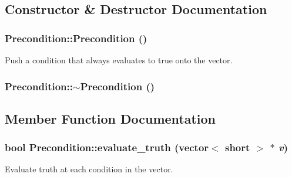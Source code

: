 \subsection{Constructor \& Destructor Documentation}
\hypertarget{classPrecondition_ab7e54d0ab9cbfb4b4a6cb03a20946207}{
\subsubsection[{Precondition}]{\setlength{\rightskip}{0pt plus 5cm}Precondition::Precondition ()}}
\label{classPrecondition_ab7e54d0ab9cbfb4b4a6cb03a20946207}
Push a condition that always evaluates to true onto the vector. \hypertarget{classPrecondition_af8c382b226efa4b36e2d7c442dc20e72}{
\subsubsection[{$\sim$Precondition}]{\setlength{\rightskip}{0pt plus 5cm}Precondition::$\sim$Precondition ()}}
\label{classPrecondition_af8c382b226efa4b36e2d7c442dc20e72}


\subsection{Member Function Documentation}
\hypertarget{classPrecondition_a789430a3175b7e760d38e31e0aa0bd44}{
\subsubsection[{evaluate\_\-truth}]{\setlength{\rightskip}{0pt plus 5cm}bool Precondition::evaluate\_\-truth (vector$<$ short $>$ $\ast$ {\em v})}}
\label{classPrecondition_a789430a3175b7e760d38e31e0aa0bd44}
Evaluate truth at each condition in the vector.


